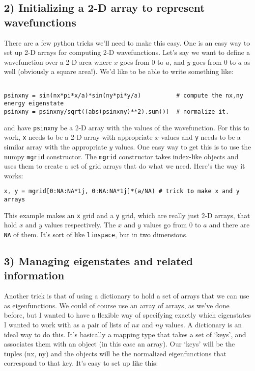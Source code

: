 \documentclass[11pt]{article} %
\begin{document}
\subsection*{2) Initializing a 2-D array to represent wavefunctions}

There are a few python tricks we'll need to make this easy. One is an easy way to set up 2-D arrays for computing 2-D wavefunctions. Let's say we want to define a wavefunction over a 2-D area where $x$ goes from $0$ to $a$, and $y$ goes from $0$ to $a$ as well (obviously a square area!). We'd like to be able to write something like:

\begin{verbatim}

psinxny = sin(nx*pi*x/a)*sin(ny*pi*y/a)          # compute the nx,ny energy eigenstate
psinxny = psinxny/sqrt((abs(psinxny)**2).sum())  # normalize it.

\end{verbatim}

and have {\tt psinxny} be a 2-D array with the values of the wavefunction. For this to work, {\tt x} needs to be a 2-D array with appropriate $x$ values and {\tt y} needs to be a similar array with the appropriate $y$ values. One easy way to get this is to use the numpy {\tt mgrid} constructor. The {\tt mgrid} constructor takes index-like objects and uses them to create a set of grid arrays that do what we need. Here's the way it works:

\begin{verbatim}
x, y = mgrid[0:NA:NA*1j, 0:NA:NA*1j]*(a/NA) # trick to make x and y arrays

\end{verbatim}

This example makes an {\tt x} grid and a {\tt y} grid, which are really just 2-D arrays, that hold $x$ and $y$ values respectively. The $x$ and $y$ values go from $0$ to $a$ and there are {\tt NA} of them. It's sort of like {\tt linspace}, but in two dimensions.

\subsection*{3) Managing eigenstates and related information}

Another trick is that of using a dictionary to hold a set of arrays that we can use as eigenfunctions. We could of course use an array of arrays, as we've done before, but I wanted to have a flexible way of specifying exactly which eigenstates I wanted to work with as a pair of lists of $nx$ and $ny$ values. A dictionary is an ideal way to do this. It's basically a mapping type that takes a set of `keys', and associates them with an object (in this case an array). Our `keys' will be the tuples (nx, ny) and the objects will be the normalized eigenfunctions that correspond to that key. It's easy to set up like this:
\end{document}
